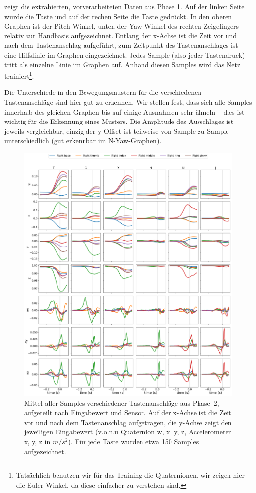  zeigt die extrahierten, vorverarbeiteten Daten aus
Phase 1. Auf der linken Seite wurde die Taste  und auf der rechen
Seite die Taste  gedrückt. In den oberen Graphen ist der
Pitch-Winkel, unten der Yaw-Winkel des rechten Zeigefingers relativ zur
Handbasis aufgezeichnet.  Entlang der x-Achse ist die Zeit vor und nach dem
Tastenanschlag aufgeführt, zum Zeitpunkt des Tastenanschlages ist eine
Hilfslinie im Graphen eingezeichnet.  Jedes Sample (also jeder Tastendruck)
tritt als einzelne Linie im Graphen auf. Anhand diesen Samples wird das Netz
trainiert\footnote{Tatsächlich benutzen wir für das Training die Quaternionen,
wir zeigen hier die Euler-Winkel, da diese einfacher zu verstehen sind.}.

Die Unterschiede in den Bewegungsmustern für die verschiedenen Tastenanschläge
sind hier gut zu erkennen. Wir stellen fest, dass sich alle Samples innerhalb
des gleichen Graphen bis auf einige Ausnahmen sehr ähneln -- dies ist wichtig
für die Erkennung eines Musters.  Die Amplitude des Ausschlages ist jeweils
vergleichbar, einzig der y-Offset ist teilweise von Sample zu Sample
unterschiedlich (gut erkennbar im N-Yaw-Graphen).

\begin{figure}[p]
    \centering
    \advance\leftskip-2cm
    \includegraphics[width=17cm]{../common/images/graphs-average}
    \caption[Mittel aller Samples verschiedener Tastenanschläge aus
    Phase~2]{Mittel aller Samples verschiedener Tastenanschläge aus Phase~2,
    aufgeteilt nach Eingabewert und Sensor. Auf der x-Achse ist die Zeit vor
    und nach dem Tastenanschlag aufgetragen, die y-Achse zeigt den jeweiligen
    Eingabewert (v.o.n.u Quaternion w, x, y, z, Accelerometer x, y, z in
    $m/s^2$).  Für jede Taste wurden etwa 150 Samples aufgezeichnet.}
\end{figure}

